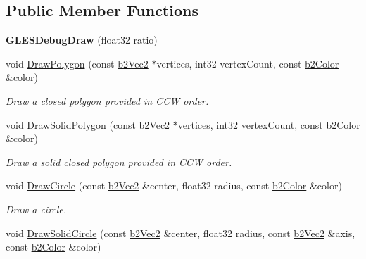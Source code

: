 \subsection*{Public Member Functions}
\begin{DoxyCompactItemize}
\item 
\hypertarget{class_g_l_e_s_debug_draw_a658e964ffb386b8b67fb5a3bc5db27a3}{{\bfseries G\-L\-E\-S\-Debug\-Draw} (float32 ratio)}\label{class_g_l_e_s_debug_draw_a658e964ffb386b8b67fb5a3bc5db27a3}

\item 
\hypertarget{class_g_l_e_s_debug_draw_afab4f8ea8882119f62134f9667e9e2da}{void \hyperlink{class_g_l_e_s_debug_draw_afab4f8ea8882119f62134f9667e9e2da}{Draw\-Polygon} (const \hyperlink{structb2_vec2}{b2\-Vec2} $\ast$vertices, int32 vertex\-Count, const \hyperlink{structb2_color}{b2\-Color} \&color)}\label{class_g_l_e_s_debug_draw_afab4f8ea8882119f62134f9667e9e2da}

\begin{DoxyCompactList}\small\item\em Draw a closed polygon provided in C\-C\-W order. \end{DoxyCompactList}\item 
\hypertarget{class_g_l_e_s_debug_draw_aa68490f03cf0cb567ce6ccd78b18c5c3}{void \hyperlink{class_g_l_e_s_debug_draw_aa68490f03cf0cb567ce6ccd78b18c5c3}{Draw\-Solid\-Polygon} (const \hyperlink{structb2_vec2}{b2\-Vec2} $\ast$vertices, int32 vertex\-Count, const \hyperlink{structb2_color}{b2\-Color} \&color)}\label{class_g_l_e_s_debug_draw_aa68490f03cf0cb567ce6ccd78b18c5c3}

\begin{DoxyCompactList}\small\item\em Draw a solid closed polygon provided in C\-C\-W order. \end{DoxyCompactList}\item 
\hypertarget{class_g_l_e_s_debug_draw_a9beacb1f221106e10ea68614ff336bf8}{void \hyperlink{class_g_l_e_s_debug_draw_a9beacb1f221106e10ea68614ff336bf8}{Draw\-Circle} (const \hyperlink{structb2_vec2}{b2\-Vec2} \&center, float32 radius, const \hyperlink{structb2_color}{b2\-Color} \&color)}\label{class_g_l_e_s_debug_draw_a9beacb1f221106e10ea68614ff336bf8}

\begin{DoxyCompactList}\small\item\em Draw a circle. \end{DoxyCompactList}\item 
\hypertarget{class_g_l_e_s_debug_draw_ac06ea317fe6075cb9e1ff87ff89b8007}{void \hyperlink{class_g_l_e_s_debug_draw_ac06ea317fe6075cb9e1ff87ff89b8007}{Draw\-Solid\-Circle} (const \hyperlink{structb2_vec2}{b2\-Vec2} \&center, float32 radius, const \hyperlink{structb2_vec2}{b2\-Vec2} \&axis, const \hyperlink{structb2_color}{b2\-Color} \&color)}\label{class_g_l_e_s_debug_draw_ac06ea317fe6075cb9e1ff87ff89b8007}


\end{DoxyCompactItemize}
